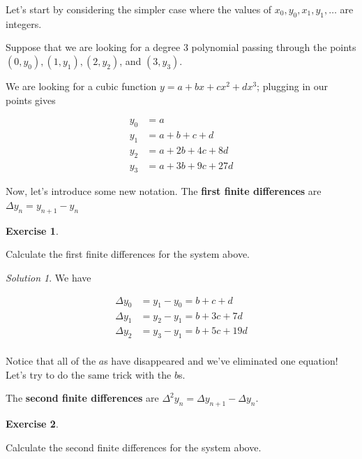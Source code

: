 \documentclass[
]{book}
\theoremstyle{definition}
\theoremstyle{definition}
\theoremstyle{definition}
\newtheorem{exercise}{Exercise}[chapter]
\theoremstyle{definition}
\theoremstyle{remark}
\newtheorem*{solution}{Solution}
\begin{document}
Let's start by considering the simpler case where the values of \(x_0, y_0, x_1, y_1,\ldots\) are integers.

Suppose that we are looking for a degree \(3\) polynomial passing through the points \((0,y_0), (1, y_1), (2,y_2)\), and \((3,y_3)\).

We are looking for a cubic function \(y= a+bx+cx^2+dx^3\); plugging in our points gives

\begin{align*}
y_0 &= a \\
y_1 &= a+b+c+d\\
y_2 &= a+ 2b+4c+8d \\
y_3 &= a+3b+9c+27d
\end{align*}

Now, let's introduce some new notation. The \textbf{first finite differences} are \(\Delta y_n = y_{n+1}-y_n\)

\begin{exercise}
\protect\hypertarget{exr:unlabeled-div-138}{}\label{exr:unlabeled-div-138}

Calculate the first finite differences for the system above.

\end{exercise}

\begin{solution}

We have

\begin{align*}
\Delta y_0 &= y_1-y_0 = b+c+d \\
\Delta y_1 &= y_2-y_1 = b+3c+7d \\
\Delta y_2 &= y_3-y_1 = b+5c+19d \\
\end{align*}

\end{solution}

Notice that all of the \(a\)s have disappeared and we've eliminated one equation! Let's try to do the same trick with the \(b\)s.

The \textbf{second finite differences} are \(\Delta^2y_n = \Delta y_{n+1}-\Delta y_n\).

\begin{exercise}
\protect\hypertarget{exr:unlabeled-div-140}{}\label{exr:unlabeled-div-140}

Calculate the second finite differences for the system above.

\end{exercise}
\end{document}
